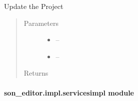 \documentclass[letterpaper,10pt,english]{sphinxmanual}
\begin{document}
\begin{fulllineitems}
\label{_source/son_editor.impl:son_editor.impl.projectsimpl.update_project}
Update the Project
\begin{quote}\begin{description}
\item[{Parameters}] \leavevmode\begin{itemize}
\item {} 
 -- 

\item {} 
 -- 

\end{itemize}

\item[{Returns}] \leavevmode


\end{description}\end{quote}

\end{fulllineitems}



\paragraph{son\_editor.impl.servicesimpl module}
\label{_source/son_editor.impl:module-son_editor.impl.servicesimpl}\label{_source/son_editor.impl:son-editor-impl-servicesimpl-module}
\end{document}

